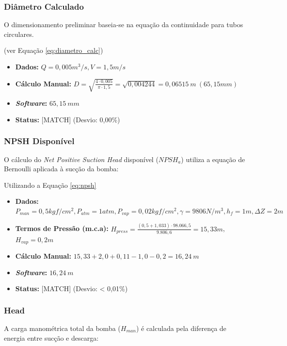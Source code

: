 \subsubsection{Diâmetro Calculado}
O dimensionamento preliminar baseia-se na equação da continuidade para tubos circulares.

(ver Equação \ref{eq:diametro_calc})

\begin{itemize}
    \item \textbf{Dados:} $Q=0,005 m^3/s, V=1,5 m/s$
    \item \textbf{Cálculo Manual:} $D = \sqrt{\frac{4 \cdot 0,005}{\pi \cdot 1,5}} = \sqrt{0,004244} = 0,06515 \ m \ (65,15 mm)$
    \item \textbf{\textit{Software}:} $65,15 \ mm$
    \item \textbf{Status:} [MATCH] (Desvio: 0,00\%)
\end{itemize}

\subsubsection{NPSH Disponível}
O cálculo do \textit{Net Positive Suction Head} disponível ($NPSH_a$) utiliza a equação de Bernoulli aplicada à sucção da bomba:

\begin{center} Utilizando a Equação \ref{eq:npsh} \end{center}

\begin{itemize}
    \item \textbf{Dados:} $P_{man}=0,5 kgf/cm^2, P_{atm}=1 atm, P_{vap}=0,02 kgf/cm^2, \gamma=9806 N/m^3, h_f=1m, \Delta Z=2m$
    \item \textbf{Termos de Pressão (m.c.a):} $H_{press} = \frac{(0,5+1,033) \cdot 98.066,5}{9.806,6} = 15,33 m$, $H_{vap} = 0,2 m$
    \item \textbf{Cálculo Manual:} $15,33 + 2,0 + 0,11 - 1,0 - 0,2 = 16,24 \ m$
    \item \textbf{\textit{Software}:} $16,24 \ m$
    \item \textbf{Status:} [MATCH] (Desvio: < 0,01\%)
\end{itemize}

\subsubsection{Head}
A carga manométrica total da bomba ($H_{man}$) é calculada pela diferença de energia entre sucção e descarga:

